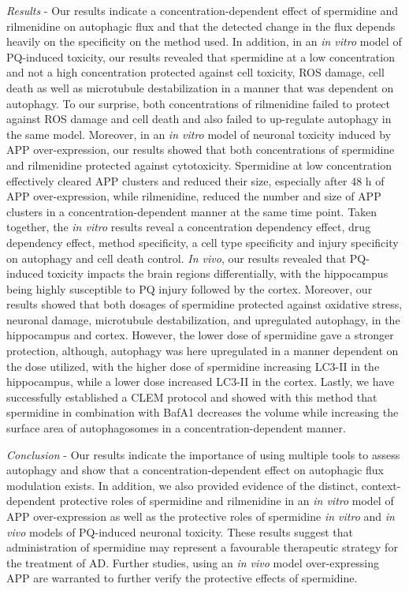 \textit{Results} - Our results indicate a concentration-dependent effect of spermidine and rilmenidine on autophagic flux and that the detected change in the flux depends heavily on the specificity on the method used.  In addition, in an \textit{in vitro} model of PQ-induced toxicity, our results revealed that spermidine at a low concentration and not a high concentration protected against cell toxicity, ROS damage, cell death as well as microtubule destabilization in a manner that was dependent on autophagy. To our surprise, both concentrations of rilmenidine failed to protect against ROS damage and cell death and also failed to up-regulate autophagy in the same model.  Moreover, in an \textit{in vitro} model of neuronal toxicity induced by APP over-expression, our results showed that both concentrations of spermidine and rilmenidine protected against cytotoxicity. Spermidine at low concentration effectively cleared APP clusters and reduced their size, especially after 48 h of APP over-expression, while rilmenidine, reduced the number and size of APP clusters in a concentration-dependent manner at the same time point.  
Taken together, the \textit{in vitro} results reveal a concentration dependency effect, drug dependency effect, method specificity, a cell type specificity and injury specificity on autophagy and cell death control. \textit{In vivo}, our results revealed that PQ-induced toxicity impacts the brain regions differentially, with the hippocampus being highly susceptible to PQ injury followed by the cortex. Moreover, our results showed that both dosages of spermidine protected against oxidative stress, neuronal damage, microtubule destabilization, and upregulated autophagy, in the hippocampus and cortex. However, the lower dose of spermidine gave a stronger protection, although, autophagy was here upregulated in a manner dependent on the dose utilized, with the higher dose of spermidine increasing LC3-II in the hippocampus, while a lower dose increased LC3-II in the cortex. Lastly, we have successfully established a CLEM protocol and showed with this method that spermidine in combination with BafA1 decreases the volume while increasing the surface area of autophagosomes in a concentration-dependent manner. 

\textit{Conclusion} - Our results indicate the importance of using multiple tools to assess autophagy and show that a concentration-dependent effect on autophagic flux modulation exists. In addition, we also provided evidence of the distinct, context-dependent protective roles of spermidine and rilmenidine in an \textit{in vitro} model of APP over-expression as well as the protective roles of spermidine \textit{in vitro} and \textit{in vivo} models of PQ-induced neuronal toxicity. These results suggest that administration of spermidine may represent a favourable therapeutic strategy for the treatment of AD. Further studies, using an \textit{in vivo} model over-expressing APP are warranted to further verify the protective effects of spermidine. 

